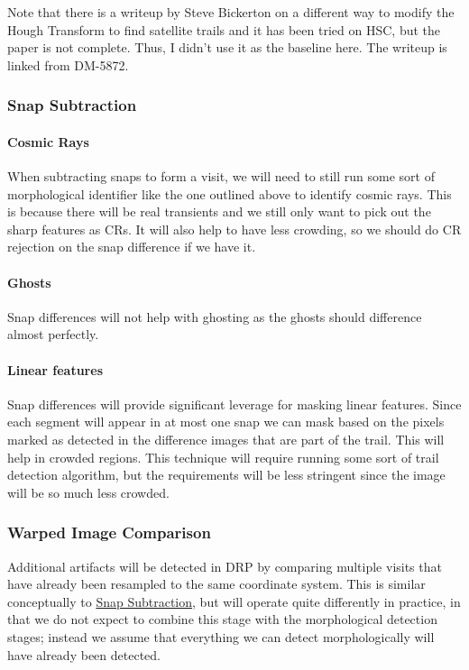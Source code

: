 \begin{note}
Note that there is a writeup by Steve Bickerton on a different way to modify the Hough Transform to find satellite trails and it has been tried on HSC, but the paper is not complete.  Thus, I didn't use it as the baseline here.  The writeup is linked from DM-5872.
\end{note}

\subsubsection{Snap Subtraction}
\label{sec:acSnapSubtraction}
\paragraph{Cosmic Rays}
When subtracting snaps to form a visit, we will need to still run some sort of morphological identifier like the one outlined above to identify cosmic rays.  This is because there will be real transients and we still only want to pick out the sharp features as CRs.  It will also help to have less crowding, so we should do CR rejection on the snap difference if we have it.

\paragraph{Ghosts}
Snap differences will not help with ghosting as the ghosts should difference almost perfectly.

\paragraph{Linear features}
Snap differences will provide significant leverage for masking linear features.  Since each segment will appear in at most one snap we can mask based on the pixels marked as detected in the difference images that are part of the trail.  This will help in crowded regions.  This technique will require running some sort of trail detection algorithm, but the requirements will be less stringent since the image will be so much less crowded.

\subsubsection{Warped Image Comparison}
\label{sec:acWarpedImageArtifactDetection}

Additional artifacts will be detected in DRP by comparing multiple visits that have already been resampled to the same coordinate system.  This is similar conceptually to \hyperref[sec:acSnapSubtraction]{Snap Subtraction}, but will operate quite differently in practice, in that we do not expect to combine this stage with the morphological detection stages; instead we assume that everything we can detect morphologically will have already been detected.

